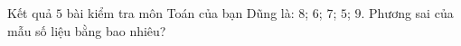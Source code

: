 \begin{ex}
Kết quả $5$ bài kiểm tra môn Toán của bạn Dũng là: $8$; $6$; $7$; $5$; $9$. Phương sai của mẫu số liệu bằng bao nhiêu?
\end{ex}

